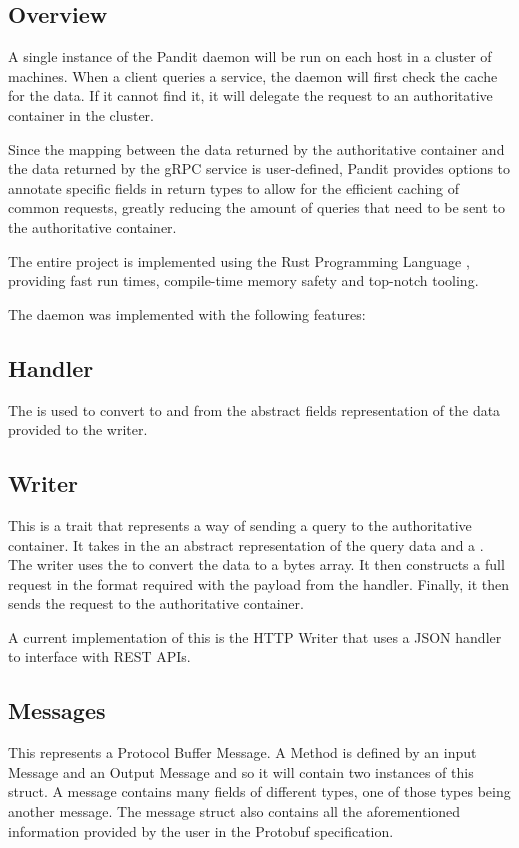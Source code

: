 \documentclass[a4paper,12pt]{report}
\begin{document}
\subsection{Overview}
A single instance of the Pandit daemon will be run on each host in a cluster of machines. When a client queries
a service, the daemon will first check the cache for the data. If it cannot find it, it will delegate the request
to an authoritative container in the cluster.

Since the mapping between the data returned by the authoritative container and the data returned by the gRPC service is
user-defined, Pandit provides options to annotate specific fields in return types to allow for the efficient caching of
common requests, greatly reducing the amount of queries that need to be sent to the authoritative container.

The entire project is implemented using the Rust Programming Language \cite{rust}, providing fast run times, compile-time memory safety
and top-notch tooling.

The daemon was implemented with the following features:

\subsection{Handler}
\label{sec:handler}
The \textit{} is used to convert to and from the abstract fields representation of the data provided to the writer.

\subsection{Writer}
\label{sec:writer}
This is a trait \cite{trait} that represents a way of sending a query to the authoritative container.
It takes in the an abstract representation of the query data and a \textit{}.
The writer uses the \textit{} to convert the data to a bytes array.
It then constructs a full request in the format required with the payload from the handler.
Finally, it then sends the request to the authoritative container.

A current implementation of this is the HTTP Writer that uses a JSON handler to interface with REST APIs.

\subsection{Messages}
\label{sec:messages}
This represents a Protocol Buffer Message. A Method is defined by an input Message and an Output Message and so it will contain two instances of this struct.
A message contains many fields of different types, one of those types being another message. The message struct also contains all the
aforementioned information provided by the user in the Protobuf specification.
\end{document}
